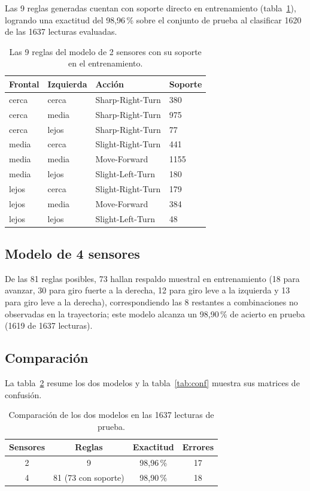 \documentclass[11pt,letterpaper]{article}
\begin{document}
Las 9 reglas generadas cuentan con soporte directo en entrenamiento (tabla~\ref{tab:reglas2}), logrando una exactitud del 98,96\,\% sobre el conjunto de prueba al clasificar 1620 de las 1637 lecturas evaluadas.

\begin{table}[H]
\centering
\caption{Las 9 reglas del modelo de 2 sensores con su soporte en el entrenamiento.}\label{tab:reglas2}
\begin{tabular}{llll}
\toprule
Frontal & Izquierda & Acción & Soporte \\
\midrule
cerca & cerca & Sharp-Right-Turn & 380 \\
cerca & media & Sharp-Right-Turn & 975 \\
cerca & lejos & Sharp-Right-Turn & 77 \\
media & cerca & Slight-Right-Turn & 441 \\
media & media & Move-Forward & 1155 \\
media & lejos & Slight-Left-Turn & 180 \\
lejos & cerca & Slight-Right-Turn & 179 \\
lejos & media & Move-Forward & 384 \\
lejos & lejos & Slight-Left-Turn & 48 \\
\bottomrule
\end{tabular}
\end{table}

\subsection{Modelo de 4 sensores}

De las 81 reglas posibles, 73 hallan respaldo muestral en entrenamiento (18 para avanzar, 30 para giro fuerte a la derecha, 12 para giro leve a la izquierda y 13 para giro leve a la derecha), correspondiendo las 8 restantes a combinaciones no observadas en la trayectoria; este modelo alcanza un 98,90\,\% de acierto en prueba (1619 de 1637 lecturas).

\subsection{Comparación}

La tabla~\ref{tab:comp} resume los dos modelos y la tabla~\ref{tab:conf} muestra sus matrices de confusión.

\begin{table}[H]
\centering
\caption{Comparación de los dos modelos en las 1637 lecturas de prueba.}\label{tab:comp}
\begin{tabular}{cccc}
\toprule
Sensores & Reglas & Exactitud & Errores \\
\midrule
2 & 9 & 98,96\,\% & 17 \\
4 & 81 (73 con soporte) & 98,90\,\% & 18 \\
\bottomrule
\end{tabular}
\end{table}
\end{document}
